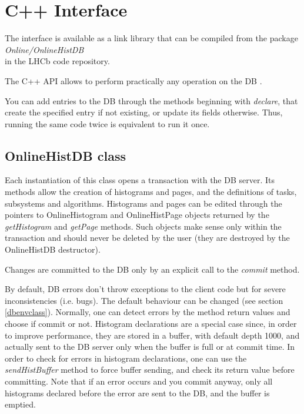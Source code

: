 \documentclass{lhcbnote}
\begin{document}
\section{C++ Interface}

The interface is available as a link library that can be compiled from
the package \\
{\it Online/OnlineHistDB} \\
in the LHCb code repository.

The C++ API allows to perform practically any operation on the DB .

You can add entries to the DB through the methods beginning with {\it
declare}, that create the specified entry if not existing, or 
update its fields otherwise. Thus, running the same code twice is
equivalent to run it once.


\subsection{OnlineHistDB class}
Each instantiation of this class opens a transaction with the DB
server. Its methods allow the creation of histograms and pages, and
the definitions of tasks, subsystems and algorithms. Histograms and
pages can be edited through the pointers to OnlineHistogram and
OnlineHistPage objects returned by the {\it getHistogram} and {\it
getPage} methods. Such objects make sense only within the transaction
and should never be deleted by the user (they are destroyed by the
OnlineHistDB destructor). 

Changes are committed to the DB only by an explicit call to the {\it
commit} method.

By default, DB errors don't throw exceptions to the client code but
for severe inconsistencies (i.e. bugs). The default behaviour can be
changed (see section \ref{dbenvclass}). Normally, one can detect
errors by the method return values and choose if commit or not. 
Histogram declarations are a special case since, 
in order to improve performance, they are stored in
a buffer, with default depth 1000, and actually sent to the DB
server only when the buffer is full or at commit time. In order to
check for errors in histogram declarations, one can use the {\it
sendHistBuffer} method to force buffer sending, and check its return
value before committing. Note that if an error occurs and you commit anyway, 
only all histograms declared before the error are sent to the DB, and
the buffer is emptied.
\end{document}
